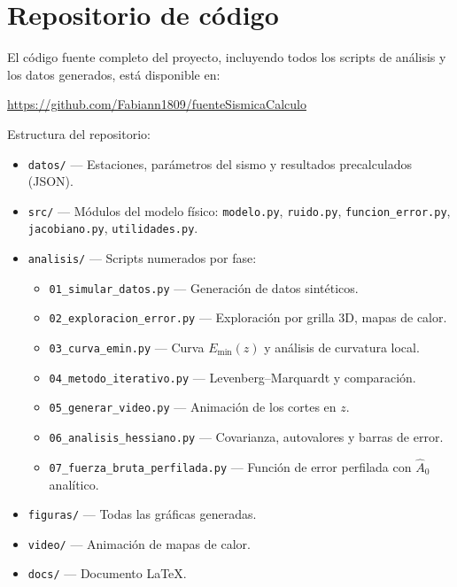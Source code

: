 \documentclass[12pt, a4paper]{article}
\begin{document}
\section{Repositorio de código}
\label{apx:repo}

El código fuente completo del proyecto, incluyendo todos los scripts
de análisis y los datos generados, está disponible en:

\begin{center}
    \url{https://github.com/Fabiann1809/fuenteSismicaCalculo}
\end{center}

Estructura del repositorio:
\begin{itemize}
    \item \texttt{datos/} — Estaciones, parámetros del sismo y
    resultados precalculados (JSON).
    \item \texttt{src/} — Módulos del modelo físico: \texttt{modelo.py},
    \texttt{ruido.py}, \texttt{funcion\_error.py}, \texttt{jacobiano.py},
    \texttt{utilidades.py}.
    \item \texttt{analisis/} — Scripts numerados por fase:
    \begin{itemize}
        \item \texttt{01\_simular\_datos.py} — Generación de datos
        sintéticos.
        \item \texttt{02\_exploracion\_error.py} — Exploración por
        grilla 3D, mapas de calor.
        \item \texttt{03\_curva\_emin.py} — Curva $E_{\min}(z)$ y
        análisis de curvatura local.
        \item \texttt{04\_metodo\_iterativo.py} —
        Levenberg--Marquardt y comparación.
        \item \texttt{05\_generar\_video.py} — Animación de los
        cortes en $z$.
        \item \texttt{06\_analisis\_hessiano.py} — Covarianza,
        autovalores y barras de error.
        \item \texttt{07\_fuerza\_bruta\_perfilada.py} — Función
        de error perfilada con $\widehat{A}_0$ analítico.
    \end{itemize}
    \item \texttt{figuras/} — Todas las gráficas generadas.
    \item \texttt{video/} — Animación de mapas de calor.
    \item \texttt{docs/} — Documento \LaTeX{}.
\end{itemize}
\end{document}
